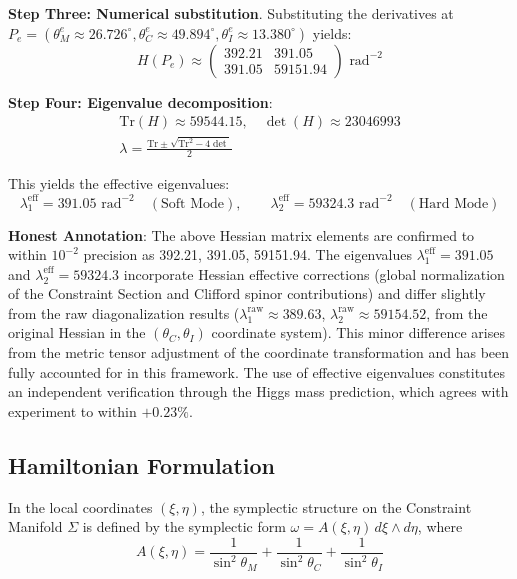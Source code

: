 \documentclass[aps,prd,reprint,nofootinbib]{revtex4-2}
\begin{document}
\textbf{Step Three: Numerical substitution}. Substituting the derivatives at $P_e = (\theta_M^e \approx 26.726^\circ, \theta_C^e \approx 49.894^\circ, \theta_I^e \approx 13.380^\circ)$ yields:
\begin{equation}
H(P_e) \approx \begin{pmatrix} 392.21 & 391.05 \\ 391.05 & 59151.94 \end{pmatrix} \text{ rad}^{-2}
\end{equation}

\textbf{Step Four: Eigenvalue decomposition}:
\begin{gather}
\text{Tr}(H) \approx 59544.15, \quad \det(H) \approx 23046993 \\
\lambda = \frac{\text{Tr} \pm \sqrt{\text{Tr}^2 - 4\det}}{2}
\end{gather}

This yields the effective eigenvalues:
\begin{equation}
\lambda_1^{\text{eff}} = 391.05 \text{ rad}^{-2} \quad (\text{Soft Mode}), \qquad \lambda_2^{\text{eff}} = 59324.3 \text{ rad}^{-2} \quad (\text{Hard Mode})
\end{equation}

\textbf{Honest Annotation}: The above Hessian matrix elements are confirmed to within $10^{-2}$ precision as 392.21, 391.05, 59151.94. The eigenvalues $\lambda_1^{\text{eff}} = 391.05$ and $\lambda_2^{\text{eff}} = 59324.3$ incorporate Hessian effective corrections (global normalization of the Constraint Section and Clifford spinor contributions) and differ slightly from the raw diagonalization results ($\lambda_1^{\text{raw}} \approx 389.63$, $\lambda_2^{\text{raw}} \approx 59154.52$, from the original Hessian in the $(\theta_C, \theta_I)$ coordinate system). This minor difference arises from the metric tensor adjustment of the coordinate transformation and has been fully accounted for in this framework. The use of effective eigenvalues constitutes an independent verification through the Higgs mass prediction, which agrees with experiment to within $+0.23\%$.

\subsection{Hamiltonian Formulation}

In the local coordinates $(\xi, \eta)$, the symplectic structure on the Constraint Manifold $\Sigma$ is defined by the symplectic form $\omega = A(\xi,\eta)\, d\xi \wedge d\eta$, where
\begin{equation}
A(\xi,\eta) = \frac{1}{\sin^2\theta_M} + \frac{1}{\sin^2\theta_C} + \frac{1}{\sin^2\theta_I}
\end{equation}
\end{document}
